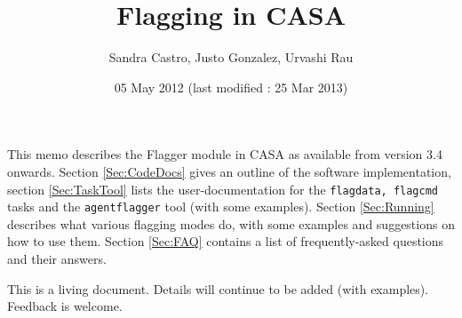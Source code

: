 \documentclass[11pt]{article}
\begin{document}
\title{Flagging in CASA}
\author{Sandra Castro, Justo Gonzalez, Urvashi Rau}
\date{05 May 2012 (last modified : 25 Mar 2013)}
\maketitle

This memo describes the Flagger module in CASA as available from version 3.4 onwards. Section \ref{Sec:CodeDocs} gives an outline of the software implementation, section \ref{Sec:TaskTool} lists the user-documentation for the {\tt flagdata, flagcmd} tasks and the {\tt agentflagger} tool (with some examples).  Section \ref{Sec:Running} describes what various flagging modes do, with some examples and suggestions on how to use them. Section \ref{Sec:FAQ} contains a list of frequently-asked questions and their answers.

This is a living document. Details will continue to be added (with examples). Feedback is welcome.

\tableofcontents




\end{document}
